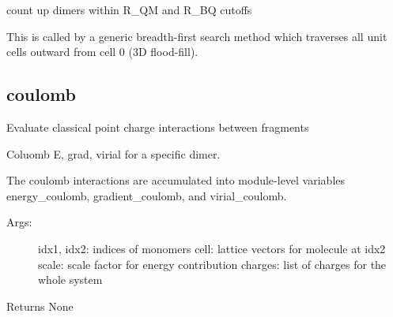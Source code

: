 \documentclass[letterpaper,10pt,english]{sphinxmanual}
\begin{document}

\begin{fulllineitems}
\label{\detokenize{globals:Globals.neighbor.pairlist_accumulator}}
count up dimers within R\_QM and R\_BQ cutoffs

This is called by a generic breadth-first search method which traverses all
unit cells outward from cell 0 (3D flood-fill).

\end{fulllineitems}



\subsection{coulomb}
\label{\detokenize{globals:module-Globals.coulomb}}\label{\detokenize{globals:coulomb}}
Evaluate classical point charge interactions between fragments

\begin{fulllineitems}
\label{\detokenize{globals:Globals.coulomb.accumulate_pair}}
Coluomb E, grad, virial for a specific dimer.

The coulomb interactions are accumulated into module-level variables
energy\_coulomb, gradient\_coulomb, and virial\_coulomb.
\begin{description}
\item[{Args:}] \leavevmode
idx1, idx2: indices of monomers
cell: lattice vectors for molecule at idx2
scale: scale factor for energy contribution
charges: list of charges for the whole system

\end{description}

Returns None

\end{fulllineitems}

\end{document}

